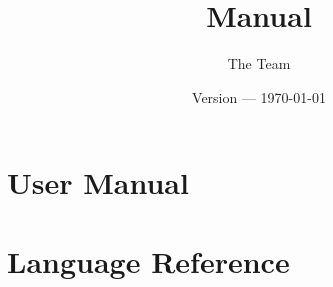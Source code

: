 \documentclass[a4paper,notitlepage]{book}
\title{\EC Manual}
\date{Version \ECversion --- \today}
\author{The \EC Team}
\begin{document}
\maketitle

\tableofcontents

\part{User Manual}






\part{Language Reference}

\printindex
\end{document}
